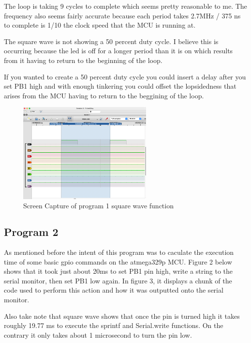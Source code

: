 \documentclass[11pt,pdftex,portrait,letterpaper]{article}
\begin{document}
The loop is taking 9 cycles to complete which seems pretty reasonable to me. The frequency also seems fairly accurate because each period takes 2.7MHz / 375 ns to complete is 1/10 the clock speed that the MCU is running at.

 The square wave is not showing a 50 percent duty cycle. I believe this is occurring because the led is off for a longer period than it is on which  results from it having to return to the beginning of the loop.
 
 If you wanted to create a 50 percent duty cycle you could insert a delay after you set PB1 high and with enough tinkering you could offset the lopsidedness that arises from the MCU having to return to the beggining of the loop. 

\begin{figure}[h]
\centering
\includegraphics[width=0.6\textwidth]{./PG1_logicAnalyzer}	%
\caption{Screen Capture of program 1 square wave function}
\label{f:fig1}	%
\end{figure}

\pagebreak


\subsection{Program 2}

As mentioned before the intent of this program was to caculate the execution time of some basic gpio commands on the atmega329p MCU. Figure 2 below shows that it took just about 20ms to set PB1 pin high, write a string to the serial monitor, then set PB1 low again.
In figure 3, it displays a chunk of the code used to perform this action and how it was outputted onto the serial monitor.

Also take note that square wave shows that once the pin is turned high it takes roughly 19.77 ms to execute the sprintf and Serial.write functions. On the contrary it only takes about 1 microsecond to turn the pin low.
\end{document}
